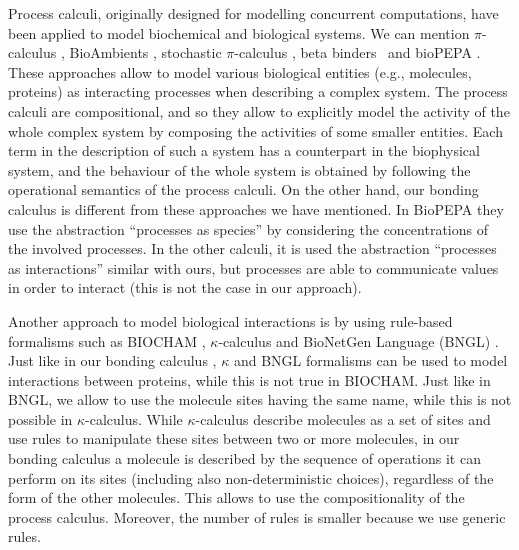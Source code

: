 \documentclass[runningheads]{llncs}
\begin{document}
Process calculi, originally designed for modelling concurrent computations, have been applied to model biochemical and biological systems. We can mention $\pi$-calculus \cite{MilnerPi,Regev2004}, BioAmbients \cite{RegevBioambients}, stochastic $\pi$-calculus \cite{PriamiStochasticPi}, beta binders~\cite{betabinders} and bioPEPA \cite{CiocchettaBiopepa}. These approaches allow to model various biological entities (e.g., molecules, proteins) as interacting processes when describing a complex system. The process calculi are compositional, and so they allow to explicitly model the activity of the whole complex system by composing the activities of some smaller entities. Each term in the description of such a system has a
counterpart in the biophysical system, and the behaviour of the whole system is obtained by following the operational semantics of the process calculi. On the other hand, our bonding calculus \cite{NaCo18} is different from these approaches we have mentioned. In BioPEPA they use the abstraction ``processes as species'' by considering the concentrations of the involved processes. In the other calculi, it is used the abstraction ``processes as interactions'' similar with ours, but processes are able to communicate values in order to interact (this is not the case in our approach).

Another approach to model biological interactions is by using rule-based formalisms such as BIOCHAM \cite{biocham}, $\kappa$-calculus  \cite{danoscausality} and BioNetGen Language (BNGL) \cite{pmid19399430}. Just like in our bonding calculus \cite{NaCo18}, $\kappa$ and BNGL formalisms can be used to model interactions between proteins, while this is not true in BIOCHAM. Just like in BNGL, we allow to use the molecule sites having the same name, while this is not possible in $\kappa$-calculus. While $\kappa$-calculus describe molecules as a set of sites and use rules to manipulate these sites between two or more molecules, in our bonding calculus \cite{NaCo18} a molecule is described by the sequence of operations it can perform on its sites (including also non-deterministic choices), regardless of the form of the other molecules. This allows to use the compositionality of the process calculus. Moreover, the number of rules is smaller because we use generic rules.
\end{document}
